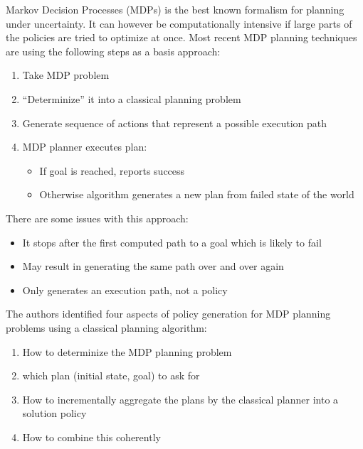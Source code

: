 \documentclass[runningheads,a4paper]{llncs}
\begin{document}
Markov Decision Processes (MDPs) is the best known formalism for planning under
uncertainty. It can however be computationally intensive if large parts of the
policies are tried to optimize at once. Most recent MDP planning techniques are
using the following steps as a basis approach:

\begin{enumerate}
	\item Take MDP problem
	\item ``Determinize''  it into a classical planning problem
	\item Generate sequence of actions that represent a possible execution
		path
	\item MDP planner executes plan:
		\begin{itemize}
			\item If goal is reached, reports success
			\item Otherwise algorithm generates a new plan from failed state of
				the world
		\end{itemize}
\end{enumerate}

There are some issues with this approach:

\begin{itemize}
	\item It stops after the first computed path to a goal which is likely to fail
	\item May result in generating the same path over and over again
	\item Only generates an execution path, not a policy
\end{itemize}

The authors identified four aspects of policy generation for MDP planning
problems using a classical planning algorithm:

\begin{enumerate}
	\item How to determinize the MDP planning problem
	\item which plan (initial state, goal) to ask for
	\item How to incrementally aggregate the plans by the classical planner
		into a solution policy
	\item How to combine this coherently
\end{enumerate}
\end{document}
